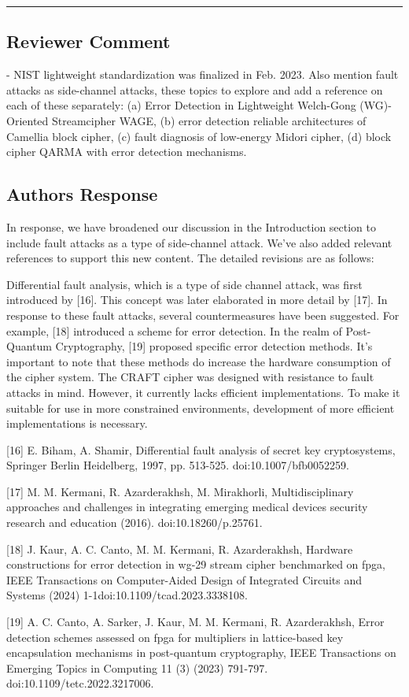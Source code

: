 \color{black}

\noindent\rule{\linewidth}{2.0pt}

\subsection{Reviewer Comment}
- NIST lightweight standardization was finalized in Feb. 2023. Also mention fault attacks as side-channel attacks, these topics to explore and add a reference on each of these separately: (a) Error Detection in Lightweight Welch-Gong (WG)-Oriented Streamcipher WAGE, (b) error detection reliable architectures of Camellia block cipher, (c) fault diagnosis of low-energy Midori cipher, (d) block cipher QARMA with error detection mechanisms.

\subsection{Authors Response}

In response, we have broadened our discussion in the Introduction section to include fault attacks as a type of side-channel attack. We've also added relevant references to support this new content. The detailed revisions are as follows:

\color{blue}

Differential fault analysis, which is a type of side channel attack, was first introduced by [16]. This concept was later elaborated in more detail by [17]. In response to these fault attacks, several countermeasures have been suggested. For example, [18] introduced a scheme for error detection. In the realm of Post-Quantum Cryptography, [19] proposed specific error detection methods. It's important to note that these methods do increase the hardware consumption of the cipher system. The CRAFT cipher was designed with resistance to fault attacks in mind. However, it currently lacks efficient implementations. To make it suitable for use in more constrained environments, development of more efficient implementations is necessary.

	[16] E. Biham, A. Shamir, Differential fault analysis of secret key cryptosystems, Springer Berlin Heidelberg, 1997, pp. 513-525. doi:10.1007/bfb0052259.


[17] M. M. Kermani, R. Azarderakhsh, M. Mirakhorli, Multidisciplinary approaches and challenges in integrating emerging medical devices security research and education (2016). \linebreak doi:10.18260/p.25761.


[18] J. Kaur, A. C. Canto, M. M. Kermani, R. Azarderakhsh, Hardware constructions for error detection in wg-29 stream cipher benchmarked on fpga, IEEE Transactions on Computer-Aided Design of Integrated Circuits and Systems (2024) 1-1doi:10.1109/tcad.2023.3338108.

[19] A. C. Canto, A. Sarker, J. Kaur, M. M. Kermani, R. Azarderakhsh, Error detection schemes assessed on fpga for multipliers in lattice-based key encapsulation mechanisms in post-quantum cryptography, IEEE Transactions on Emerging Topics in Computing 11 (3) (2023) 791-797. doi:10.1109/tetc.2022.3217006.


\color{black}



